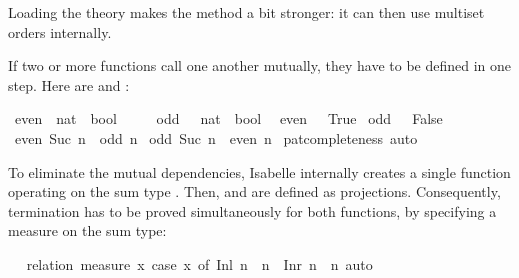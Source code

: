 \begin{isabellebody}
\begin{isamarkuptext}
  Loading the theory  makes the 
  method a bit stronger: it can then use multiset orders internally.%
\end{isamarkuptext}%
\isamarkuptrue%
%
\isamarkuptrue%
%
\begin{isamarkuptext}%
If two or more functions call one another mutually, they have to be defined
  in one step. Here are  and :%
\end{isamarkuptext}%
\isamarkuptrue%
\isamarkupfalse%
\ even\ {\isacharcolon}{\isacharcolon}\ {\isachardoublequoteopen}nat\ {\isasymRightarrow}\ bool{\isachardoublequoteclose}\isanewline
\ \ \ \ \ odd\ \ {\isacharcolon}{\isacharcolon}\ {\isachardoublequoteopen}nat\ {\isasymRightarrow}\ bool{\isachardoublequoteclose}\isanewline
{}\isanewline
\ \ {\isachardoublequoteopen}even\ {}\ {\isacharequal}\ True{\isachardoublequoteclose}\isanewline
{\isacharbar}\ {\isachardoublequoteopen}odd\ {}\ {\isacharequal}\ False{\isachardoublequoteclose}\isanewline
{\isacharbar}\ {\isachardoublequoteopen}even\ {\isacharparenleft}Suc\ n{\isacharparenright}\ {\isacharequal}\ odd\ n{\isachardoublequoteclose}\isanewline
{\isacharbar}\ {\isachardoublequoteopen}odd\ {\isacharparenleft}Suc\ n{\isacharparenright}\ {\isacharequal}\ even\ n{\isachardoublequoteclose}\isanewline
%
\isadelimproof
%
\endisadelimproof
%
\isatagproof
{}\isamarkupfalse%
\ pat{\isacharunderscore}completeness\ auto%
\endisatagproof
{\isafoldproof}%
%
\isadelimproof
%
\endisadelimproof
%
\begin{isamarkuptext}%
To eliminate the mutual dependencies, Isabelle internally
  creates a single function operating on the sum
  type . Then,  and  are
  defined as projections. Consequently, termination has to be proved
  simultaneously for both functions, by specifying a measure on the
  sum type:%
\end{isamarkuptext}%
\isamarkuptrue%
\isamarkupfalse%
\ \isanewline
%
\isadelimproof
%
\endisadelimproof
%
\isatagproof
{}\isamarkupfalse%
\ {\isacharparenleft}relation\ {\isachardoublequoteopen}measure\ {\isacharparenleft}{\isasymlambda}x{\isachardot}\ case\ x\ of\ Inl\ n\ {\isasymRightarrow}\ n\ {\isacharbar}\ Inr\ n\ {\isasymRightarrow}\ n{\isacharparenright}{\isachardoublequoteclose}{\isacharparenright}\ auto%
\endisatagproof
{\isafoldproof}%
%
\isadelimproof
%
\endisadelimproof

\end{isabellebody}

